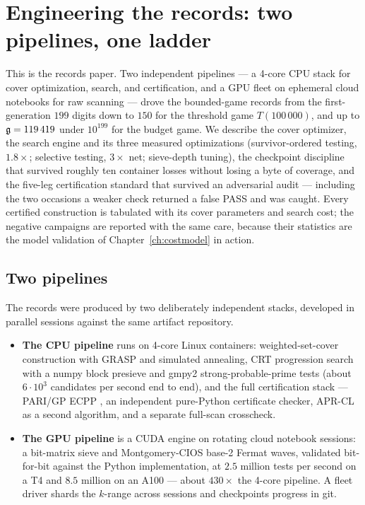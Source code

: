 \chapter{Engineering the records: two pipelines, one ladder}
\label{ch:records}

\begin{chapterabstract}
This is the records paper. Two independent pipelines --- a 4-core CPU
stack for cover optimization, search, and certification, and a GPU
fleet on ephemeral cloud notebooks for raw scanning --- drove the
bounded-game records from the first-generation $199$ digits down to
$150$ for the threshold game $T(100\,000)$, and up to
$\mathfrak{g}=119\,419$ under $10^{199}$ for the budget game. We describe the
cover optimizer, the search engine and its three measured optimizations
(survivor-ordered testing, $1.8\times$; selective testing, $3\times$
net; sieve-depth tuning), the checkpoint discipline that survived
roughly ten container losses without losing a byte of coverage, and the
five-leg certification standard that survived an adversarial audit ---
including the two occasions a weaker check returned a false PASS and was
caught. Every certified construction is tabulated with its cover
parameters and search cost; the negative campaigns are reported with the
same care, because their statistics are the model validation of
Chapter~\ref{ch:costmodel} in action.
\end{chapterabstract}

\section{Two pipelines}\label{sec:pipelines}

The records were produced by two deliberately independent stacks,
developed in parallel sessions against the same artifact repository.

\begin{itemize}
\item \textbf{The CPU pipeline} runs on 4-core Linux containers:
weighted-set-cover construction with GRASP and simulated annealing,
CRT progression search with a numpy block presieve and gmpy2
strong-probable-prime tests (about $6\cdot10^3$ candidates per second
end to end), and the full certification stack --- PARI/GP ECPP
\cite{PARI,AtkinMorain}, an independent pure-Python certificate
checker, APR-CL~\cite{APRCL} as a second algorithm, and a separate
full-scan crosscheck.
\item \textbf{The GPU pipeline} is a CUDA engine on rotating cloud
notebook sessions: a bit-matrix sieve and Montgomery-CIOS base-2 Fermat
waves, validated bit-for-bit against the Python implementation, at
$2.5$ million tests per second on a T4 and $8.5$ million on an A100 ---
about $430\times$ the 4-core pipeline. A fleet driver shards the
$k$-range across sessions and checkpoints progress in git.
\end{itemize}

